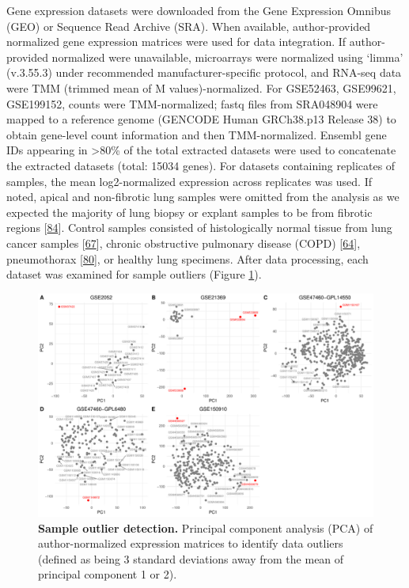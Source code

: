 \documentclass[
]{article}
\begin{document}
Gene expression datasets were downloaded from the Gene Expression Omnibus (GEO) or Sequence Read Archive (SRA). When available, author-provided normalized gene expression matrices were used for data integration. If author-provided normalized were unavailable, microarrays were normalized using `limma' (v.3.55.3) under recommended manufacturer-specific protocol, and RNA-seq data were TMM (trimmed mean of M values)-normalized. For GSE52463, GSE99621, GSE199152, counts were TMM-normalized; fastq files from SRA048904 were mapped to a reference genome (GENCODE Human GRCh38.p13 Release 38) to obtain gene-level count information and then TMM-normalized. Ensembl gene IDs appearing in \textgreater80\% of the total extracted datasets were used to concatenate the extracted datasets (total: 15034 genes). For datasets containing replicates of samples, the mean log2-normalized expression across replicates was used. If noted, apical and non-fibrotic lung samples were omitted from the analysis as we expected the majority of lung biopsy or explant samples to be from fibrotic regions {[}\protect\hyperlink{ref-luzina_transcriptomic_2018}{84}{]}. Control samples consisted of histologically normal tissue from lung cancer samples {[}\protect\hyperlink{ref-furusawa_chronic_2020}{67}{]}, chronic obstructive pulmonary disease (COPD) {[}\protect\hyperlink{ref-deng_detecting_2013}{64}{]}, pneumothorax {[}\protect\hyperlink{ref-geng_down-regulation_2015}{80}{]}, or healthy lung specimens. After data processing, each dataset was examined for sample outliers (Figure \ref{fig:outlierPCA}).



\begin{figure}

{\centering \includegraphics[width=0.9\linewidth,]{./Figures/SysReview/FigE1_outliers} 

}

\caption[Outlier detection]{\textbf{Sample outlier detection.} Principal component analysis (PCA) of author-normalized expression matrices to identify data outliers (defined as being 3 standard deviations away from the mean of principal component 1 or 2).}\label{fig:outlierPCA}
\end{figure}
\end{document}
